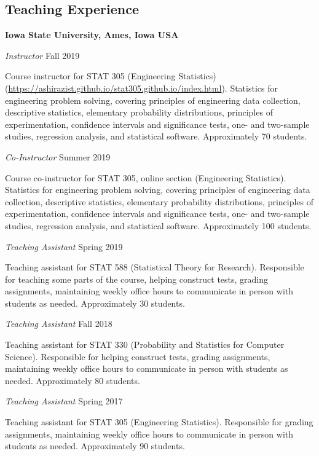 \documentclass[margin,line]{res}
\begin{document}
\begin{resume}
\section{\sc Teaching Experience}

{\bf Iowa State University, Ames, Iowa USA}

{\em Instructor} \hfill { Fall 2019}

\vspace{-.3cm}
Course instructor for STAT 305 (Engineering Statistics) (\url{https://ashirazist.github.io/stat305.github.io/index.html}). Statistics for engineering problem solving, covering principles of engineering data collection, descriptive statistics, elementary probability distributions, principles of experimentation, confidence intervals and significance tests, one- and two-sample studies, regression analysis, and statistical software. Approximately 70 students.

{\em Co-Instructor} \hfill { Summer 2019}

\vspace{-.3cm}
Course co-instructor for STAT 305, online section (Engineering Statistics). Statistics for engineering problem solving, covering principles of engineering data collection, descriptive statistics, elementary probability distributions, principles of experimentation, confidence intervals and significance tests, one- and two-sample studies, regression analysis, and statistical software. Approximately 100 students.

{\em Teaching Assistant} \hfill { Spring 2019}

\vspace{-.3cm}
Teaching assistant for STAT 588 (Statistical Theory for Research). Responsible for teaching some parts of the course, helping construct tests, grading assignments, maintaining weekly office hours to communicate in person with students as needed. Approximately 30 students.

{\em Teaching Assistant} \hfill { Fall 2018}

\vspace{-.3cm}
Teaching assistant for STAT 330 (Probability and Statistics for Computer Science). Responsible for  helping construct tests, grading assignments, maintaining weekly office hours to communicate in person with students as needed. Approximately 80 students.

{\em Teaching Assistant} \hfill { Spring 2017}

\vspace{-.3cm}
Teaching assistant for STAT 305  (Engineering Statistics). Responsible for grading assignments, maintaining weekly office hours to communicate in person with students as needed. Approximately 90 students.


\end{resume}
\end{document}
